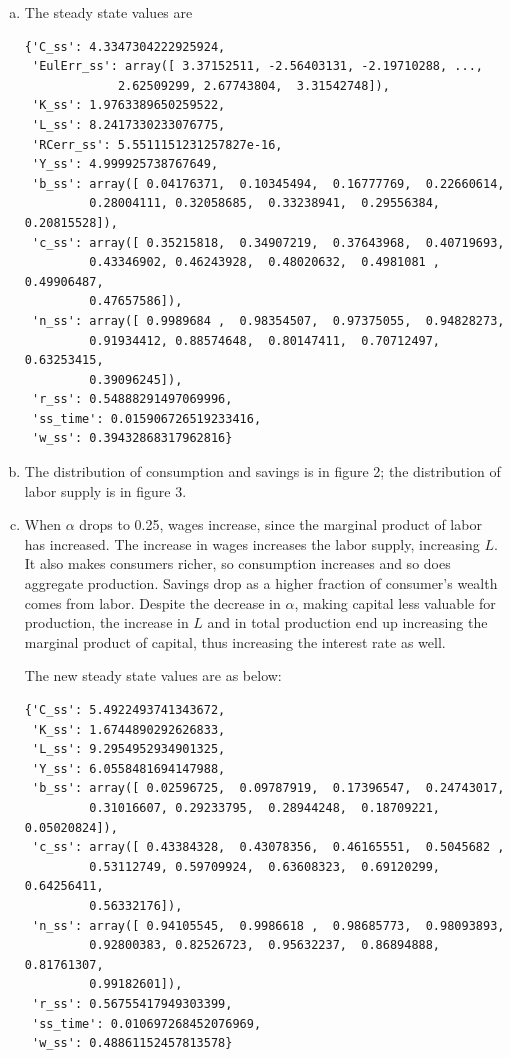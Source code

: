 \documentclass[letterpaper,12pt]{article}
\theoremstyle{definition}
\begin{document}
\begin{enumerate}
	\begin{enumerate}[(a)]
	\item The steady state values are
	\begin{verbatim}
{'C_ss': 4.3347304222925924,
 'EulErr_ss': array([ 3.37152511, -2.56403131, -2.19710288, ..., 
 			 2.62509299, 2.67743804,  3.31542748]),
 'K_ss': 1.9763389650259522,
 'L_ss': 8.2417330233076775,
 'RCerr_ss': 5.5511151231257827e-16,
 'Y_ss': 4.999925738767649,
 'b_ss': array([ 0.04176371,  0.10345494,  0.16777769,  0.22660614,  
         0.28004111, 0.32058685,  0.33238941,  0.29556384,  0.20815528]),
 'c_ss': array([ 0.35215818,  0.34907219,  0.37643968,  0.40719693, 
         0.43346902, 0.46243928,  0.48020632,  0.4981081 , 0.49906487,
         0.47657586]),
 'n_ss': array([ 0.9989684 ,  0.98354507,  0.97375055,  0.94828273,  
         0.91934412, 0.88574648,  0.80147411,  0.70712497,  0.63253415, 
         0.39096245]),
 'r_ss': 0.54888291497069996,
 'ss_time': 0.015906726519233416,
 'w_ss': 0.39432868317962816}
	\end{verbatim}
	\item The distribution of consumption and savings is in figure 2; the distribution of labor supply is in figure 3.
	\item When $\alpha$ drops to 0.25, wages increase, since the marginal product of labor has increased. The increase in wages increases the labor supply, increasing $L$. It also makes consumers richer, so consumption increases and so does aggregate production. Savings drop as a higher fraction of consumer's wealth comes from labor. Despite the decrease in $\alpha$, making capital less valuable for production, the increase in $L$ and in total production end up increasing the marginal product of capital, thus increasing the interest rate as well. 
	
The new steady state values are as below:
	\begin{verbatim}
{'C_ss': 5.4922493741343672,
 'K_ss': 1.6744890292626833,
 'L_ss': 9.2954952934901325,
 'Y_ss': 6.0558481694147988,
 'b_ss': array([ 0.02596725,  0.09787919,  0.17396547,  0.24743017,  
         0.31016607, 0.29233795,  0.28944248,  0.18709221,  0.05020824]),
 'c_ss': array([ 0.43384328,  0.43078356,  0.46165551,  0.5045682 ,  
         0.53112749, 0.59709924,  0.63608323,  0.69120299, 0.64256411,  
         0.56332176]),
 'n_ss': array([ 0.94105545,  0.9986618 ,  0.98685773,  0.98093893,  
         0.92800383, 0.82526723,  0.95632237,  0.86894888,  0.81761307,  
         0.99182601]),
 'r_ss': 0.56755417949303399,
 'ss_time': 0.010697268452076969,
 'w_ss': 0.48861152457813578}
	\end{verbatim}
	\end{enumerate}
	

\end{enumerate}
\end{document}
